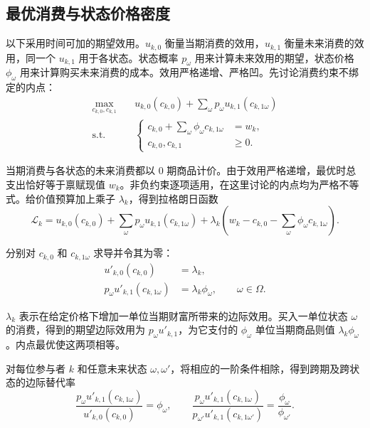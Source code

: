\subsection{最优消费与状态价格密度}
以下采用时间可加的期望效用。$u_{k,0}$ 衡量当期消费的效用，$u_{k,1}$ 衡量未来消费的效用，同一个 $u_{k,1}$ 用于各状态。状态概率 $p_\omega$ 用来计算未来效用的期望，状态价格 $\phi_\omega$ 用来计算购买未来消费的成本。效用严格递增、严格凹。先讨论消费约束不绑定的内点：
\begin{equation}
 \begin{aligned}
 \max_{c_{k,0},c_{k,1}}\quad &u_{k,0}(c_{k,0})+
 \sum_\omega p_\omega u_{k,1}(c_{k,1\omega})\\
 \text{s.t.}\quad &
 \left\{\begin{aligned}
 c_{k,0}+\sum_\omega\phi_\omega c_{k,1\omega}&=w_k,\\
 c_{k,0},c_{k,1}&\ge0.
 \end{aligned}\right.
 \end{aligned}
 \label{eq:wj-10-1}
\end{equation}

当期消费与各状态的未来消费都以 0 期商品计价。由于效用严格递增，最优时总支出恰好等于禀赋现值 $w_k$。非负约束逐项适用，在这里讨论的内点均为严格不等式。给价值预算加上乘子 $\lambda_k$，得到拉格朗日函数
\[
 \mathcal L_k=u_{k,0}(c_{k,0})+\sum_\omega p_\omega u_{k,1}(c_{k,1\omega})
 +\lambda_k\left(w_k-c_{k,0}-\sum_\omega\phi_\omega c_{k,1\omega}\right).
\]

分别对 $c_{k,0}$ 和 $c_{k,1\omega}$ 求导并令其为零：
\begin{subequations}\label{eq:wj-10-2}
\begin{align}
 u'_{k,0}(c_{k,0})&=\lambda_k,\label{eq:wj-10-2a}\\
 p_\omega u'_{k,1}(c_{k,1\omega})&=\lambda_k\phi_\omega,
 \qquad \omega\in\Omega.\label{eq:wj-10-2b}
\end{align}
\end{subequations}

$\lambda_k$ 表示在给定价格下增加一单位当期财富所带来的边际效用。买入一单位状态 $\omega$ 的消费，得到的期望边际效用为 $p_\omega u'_{k,1}$，为它支付的 $\phi_\omega$ 单位当期商品则值 $\lambda_k\phi_\omega$。内点最优使这两项相等。

对每位参与者 $k$ 和任意未来状态 $\omega,\omega'$，将相应的一阶条件相除，得到跨期及跨状态的边际替代率
\begin{equation}
 \frac{p_\omega u'_{k,1}(c_{k,1\omega})}{u'_{k,0}(c_{k,0})}=\phi_\omega,
 \qquad
 \frac{p_\omega u'_{k,1}(c_{k,1\omega})}
 {p_{\omega'}u'_{k,1}(c_{k,1\omega'})}=\frac{\phi_\omega}{\phi_{\omega'}}.
 \label{eq:wj-10-3}
\end{equation}

